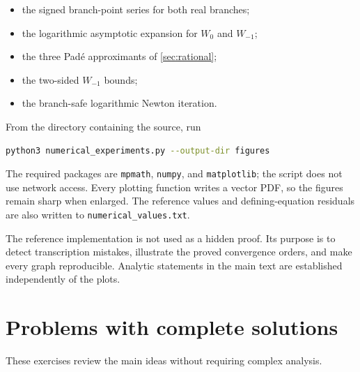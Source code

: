 \documentclass[11pt]{article}
\theoremstyle{remark}
\begin{document}
\begin{itemize}
\item the signed branch-point series for both real branches;
\item the logarithmic asymptotic expansion for \(W_0\) and \(W_{-1}\);
\item the three Pad\'e approximants of \cref{sec:rational};
\item the two-sided \(W_{-1}\) bounds;
\item the branch-safe logarithmic Newton iteration.
\end{itemize}

From the directory containing the source, run
\begin{lstlisting}[language=bash]
python3 numerical_experiments.py --output-dir figures
\end{lstlisting}
The required packages are \texttt{mpmath}, \texttt{numpy}, and
\texttt{matplotlib}; the script does not use network access.  Every plotting
function writes a vector PDF, so the figures remain sharp when enlarged.
The reference values and defining-equation residuals are also written to
\texttt{numerical\_values.txt}.



The reference implementation is not used as a hidden proof.  Its purpose is
to detect transcription mistakes, illustrate the proved convergence orders,
and make every graph reproducible.  Analytic statements in the main text are
established independently of the plots.

\section{Problems with complete solutions}\label{app:problems}

These exercises review the main ideas without requiring complex analysis.
\end{document}
